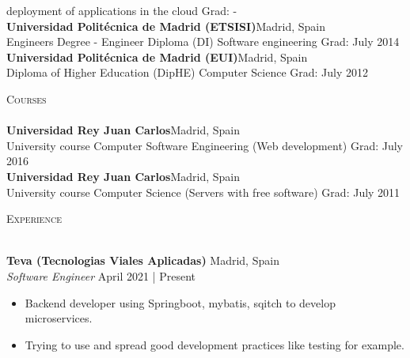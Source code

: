 \documentclass[a4paper]{article}
\newcommand{\lineunder} {
    \vspace*{-8pt} \\
    \hspace*{-18pt} \hrulefill \\
}
\newcommand{\header} [1] {
    {\hspace*{-18pt}\vspace*{6pt} \textsc{#1}}
    \vspace*{-6pt} \lineunder
}
\begin{document}
 deployment of applications in the cloud \hfill Grad: -\\
\vspace{2mm}
\textbf{Universidad Polit\'ecnica de Madrid (ETSISI)}\hfill Madrid, Spain\\
Engineer\textquotesingle s Degree  - Engineer Diploma (DI) Software engineering \hfill Grad: July 2014\\
\vspace{2mm}
\textbf{Universidad Polit\'ecnica de Madrid (EUI)}\hfill Madrid, Spain\\
Diploma of Higher Education (DipHE) Computer Science \hfill Grad: July 2012\\
\vspace{2mm}
\vspace{2mm}

\header{Courses}
\textbf{Universidad Rey Juan Carlos}\hfill Madrid, Spain\\
University course Computer Software Engineering (Web development) \hfill Grad: July 2016\\
\vspace{2mm}
\textbf{Universidad Rey Juan Carlos}\hfill Madrid, Spain\\
University course Computer Science (Servers with free software) \hfill Grad: July 2011\\
\vspace*{2mm}

\header{Experience}
\vspace{1mm}

\textbf{Teva (Tecnologias Viales Aplicadas)} \hfill Madrid, Spain\\
\textit{Software Engineer} \hfill April 2021 | Present\\
\vspace{-1mm}
\begin{itemize} \itemsep 1pt
    \item Backend developer using Springboot, mybatis, sqitch to develop microservices.
    \item Trying to use and spread good development practices like testing for example.
\end{itemize}
\end{document}
